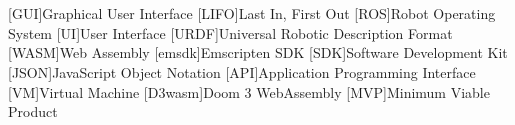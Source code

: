 \chapter*{}



\section*{}
\begin{acronym}[LONGEST]

    [GUI]{Graphical User Interface}
    [LIFO]{Last In, First Out}
    [ROS]{Robot Operating System}
    [UI]{User Interface}
    [URDF]{Universal Robotic Description Format}
    [WASM]{Web Assembly}
    [emsdk]{Emscripten SDK}
    [SDK]{Software Development Kit}
    [JSON]{JavaScript Object Notation}
    [API]{Application Programming Interface}
    [VM]{Virtual Machine}
    [D3wasm]{Doom 3 WebAssembly}
    [MVP]{Minimum Viable Product}

\end{acronym}







